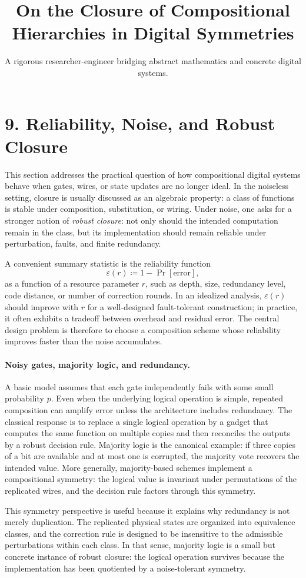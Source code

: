 \documentclass[11pt]{article}
\title{On the Closure of Compositional Hierarchies in Digital Symmetries}
\author{A rigorous researcher-engineer bridging abstract mathematics and concrete digital systems.}
\begin{document}
\section*{9. Reliability, Noise, and Robust Closure}

This section addresses the practical question of how compositional digital systems behave when gates, wires, or state updates are no longer ideal. In the noiseless setting, closure is usually discussed as an algebraic property: a class of functions is stable under composition, substitution, or wiring. Under noise, one asks for a stronger notion of \emph{robust closure}: not only should the intended computation remain in the class, but its implementation should remain reliable under perturbation, faults, and finite redundancy.

A convenient summary statistic is the reliability function
\[
\varepsilon(r) \coloneqq 1 - \Pr[\text{error}],
\]
as a function of a resource parameter \(r\), such as depth, size, redundancy level, code distance, or number of correction rounds. In an idealized analysis, \(\varepsilon(r)\) should improve with \(r\) for a well-designed fault-tolerant construction; in practice, it often exhibits a tradeoff between overhead and residual error. The central design problem is therefore to choose a composition scheme whose reliability improves faster than the noise accumulates.

\paragraph{Noisy gates, majority logic, and redundancy.}
A basic model assumes that each gate independently fails with some small probability \(p\). Even when the underlying logical operation is simple, repeated composition can amplify error unless the architecture includes redundancy. The classical response is to replace a single logical operation by a gadget that computes the same function on multiple copies and then reconciles the outputs by a robust decision rule. Majority logic is the canonical example: if three copies of a bit are available and at most one is corrupted, the majority vote recovers the intended value. More generally, majority-based schemes implement a compositional symmetry: the logical value is invariant under permutations of the replicated wires, and the decision rule factors through this symmetry.

This symmetry perspective is useful because it explains why redundancy is not merely duplication. The replicated physical states are organized into equivalence classes, and the correction rule is designed to be insensitive to the admissible perturbations within each class. In that sense, majority logic is a small but concrete instance of robust closure: the logical operation survives because the implementation has been quotiented by a noise-tolerant symmetry.
\end{document}
